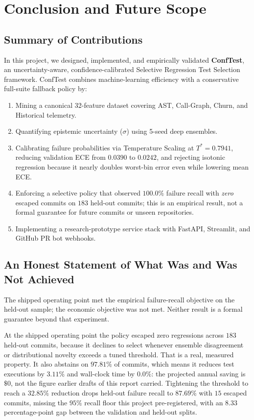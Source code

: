 \chapter{Conclusion and Future Scope}

\section{Summary of Contributions}
In this project, we designed, implemented, and empirically validated \textbf{ConfTest}, an uncertainty-aware, confidence-calibrated Selective Regression Test Selection framework. ConfTest combines machine-learning efficiency with a conservative full-suite fallback policy by:
\begin{enumerate}
    \item Mining a canonical 32-feature dataset covering AST, Call-Graph, Churn, and Historical telemetry.
    \item Quantifying epistemic uncertainty ($\sigma$) using 5-seed deep ensembles.
    \item Calibrating failure probabilities via Temperature Scaling at $T^* = 0.7941$, reducing validation ECE from $0.0390$ to $0.0242$, and rejecting isotonic regression because it nearly doubles worst-bin error even while lowering mean ECE.
    \item Enforcing a selective policy that observed $100.0\%$ failure recall with \emph{zero} escaped commits on $183$ held-out commits; this is an empirical result, not a formal guarantee for future commits or unseen repositories.
    \item Implementing a research-prototype service stack with FastAPI, Streamlit, and GitHub PR bot webhooks.
\end{enumerate}

\section{An Honest Statement of What Was and Was Not Achieved}
The shipped operating point met the empirical failure-recall objective on the held-out sample; the economic objective was not met. Neither result is a formal guarantee beyond that experiment.

At the shipped operating point the policy escaped zero regressions across $183$ held-out commits, because
it declines to select whenever ensemble disagreement or distributional novelty exceeds a tuned threshold.
That is a real, measured property. It also abstains on $97.81\%$ of commits, which means it reduces test
executions by $3.11\%$ and wall-clock time by $0.0\%$: the projected annual saving is $\$0$, not the
figure earlier drafts of this report carried. Tightening the threshold to reach a $32.85\%$ reduction
drops held-out failure recall to $87.69\%$ with $15$ escaped commits, missing the $95\%$ recall floor this
project pre-registered, with an $8.33$ percentage-point gap between the validation and held-out splits.

